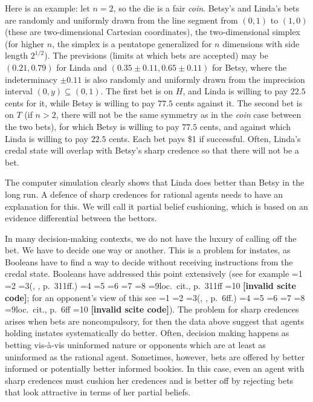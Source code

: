 \documentclass[journal]{IEEEtran}
\newcommand{\fcut}[1]{}
\newif\ifNumericalOrYear
\newcommand{\PageP}{p.~}
\newcommand{\PageP}{}
\newcommand{\scite}[3]{\ifnum#1=1\ifNumericalOrYear\citep{#2}\else\citeyearpar{#2}\fi\else
\ifnum#1=2\ifNumericalOrYear\citep[#3]{#2}\else\citep[{\PageP}#3]{#2}\fi\else
\ifnum#1=3\ifNumericalOrYear(\citet[#3]{#2})\else(\citeauthor{#2}, \citeyear{#2}, {\PageP}#3.)\fi\else
\ifnum#1=4\ifNumericalOrYear\citet{#2}\else\citet{#2}\fi\else
\ifnum#1=5\ifNumericalOrYear(\citet{#2})\else\citep{#2}\fi\else
\ifnum#1=6\ifNumericalOrYear(\citet[#3]{#2})\else\citep[{\PageP}#3]{#2}\fi\else
\ifnum#1=7\ifNumericalOrYear\citep{#2}\else\citealp{#2}\fi\else
\ifnum#1=8\ifNumericalOrYear\citep[#3]{#2}\else\citealp[{\PageP}#3]{#2}\fi\else
\ifnum#1=9\ifNumericalOrYear\citep[#3]{#2}\else{}loc.\ cit., {\PageP}#3\fi\else
\ifnum#1=10\ifNumericalOrYear\citep{#2}\else\citeyear{#2}\fi\else
\textbf{[invalid scite code]}\fi\fi\fi\fi\fi\fi\fi\fi\fi\fi}
\begin{document}
Here is an example: let $n=2$, so the die is a fair \textit{coin}.
Betsy's and Linda's bets are randomly and uniformly drawn from the
line segment from $(0,1)$ to $(1,0)$ (these are two-dimensional
Cartesian coordinates), the two-dimensional simplex (for higher $n$,
the simplex is a pentatope generalized for $n$ dimensions with side
length $2^{1/2}$). The previsions (limits at which bets are accepted)
may be $(0.21,0.79)$ for Linda and $(0.35\pm{}0.11,0.65\pm{}0.11)$ for
Betsy, where the indeterminacy $\pm{}0.11$ is also randomly and
uniformly drawn from the imprecision interval $(0,y)\subseteq(0,1)$.
The first bet is on $H$, and Linda is willing to pay $22.5$ cents for
it, while Betsy is willing to pay $77.5$ cents against it. The second
bet is on $T$ (if $n>2$, there will not be the same symmetry as in the
\textit{coin} case between the two bets), for which Betsy is willing
to pay $77.5$ cents, and against which Linda is willing to pay $22.5$
cents. Each bet pays \$1 if successful. Often, Linda's credal state
will overlap with Betsy's sharp credence so that there will not be a
bet.\fcut{7}

The computer simulation clearly shows that Linda does better than
Betsy in the long run. A defence of sharp credences for rational
agents needs to have an explanation for this. We will call it partial
belief cushioning, which is based on an evidence differential between
the bettors.

In many decision-making contexts, we do not have the luxury of calling
off the bet. We have to decide one way or another. This is a problem
for instates, as Booleans have to find a way to decide without
receiving instructions from the credal state. Booleans have addressed
this point extensively (see for example \scite{8}{joyce10}{311ff}; for
an opponent's view of this see \scite{8}{elga10}{6ff}). The problem
for sharp credences arises when bets are noncompulsory, for then the
data above suggest that agents holding instates systematically do
better. Often, decision making happens as betting vis-{\`a}-vis
uninformed nature or opponents which are at least as uninformed as the
rational agent. Sometimes, however, bets are offered by better
informed or potentially better informed bookies. In this case, even an
agent with sharp credences must cushion her credences and is better
off by rejecting bets that look attractive in terms of her partial
beliefs.
\end{document}

